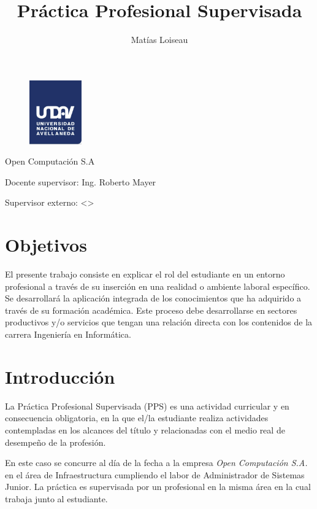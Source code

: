 \documentclass[12pt,a4paper]{article}
\author{Matías Loiseau}
\title{Práctica Profesional Supervisada}
\begin{document}
\begin{figure}
  \centering
   \includegraphics[width=0.2\textwidth]{undav-logo}
  \label{fig:undav-logo}
\end{figure}
\maketitle       %
\begin{center}
Open Computación S.A 


\thinspace\thinspace\thinspace\thinspace\thinspace\thinspace\thinspace\thinspace\thinspace\thinspace\thinspace\thinspace\thinspace\thinspace\thinspace\thinspace\thinspace\thinspace\thinspace\thinspace\thinspace\thinspace\thinspace
Docente supervisor: Ing. Roberto Mayer

Supervisor externo: <>
\end{center}
\cleardoublepage

\tableofcontents %
\cleardoublepage

\section{Objetivos}
El presente trabajo consiste en explicar el rol del estudiante en un entorno profesional a través de su inserción en una realidad o ambiente laboral específico. Se desarrollará la aplicación integrada de los conocimientos que ha adquirido a través de su formación académica. Este proceso debe desarrollarse en sectores productivos y/o servicios que tengan una relación directa con los contenidos de la carrera Ingeniería en Informática.

\section{Introducción}
La Práctica Profesional Supervisada (PPS) es una actividad curricular y en consecuencia obligatoria, en la que el/la estudiante realiza actividades contempladas en los alcances del título y relacionadas con el medio real de desempeño de la profesión.

En este caso se concurre al día de la fecha a la empresa \emph{Open Computación S.A.} en el área de Infraestructura cumpliendo el labor de Administrador de Sistemas Junior. La práctica es supervisada por un profesional en la misma área en la cual trabaja junto al estudiante.
\end{document}
